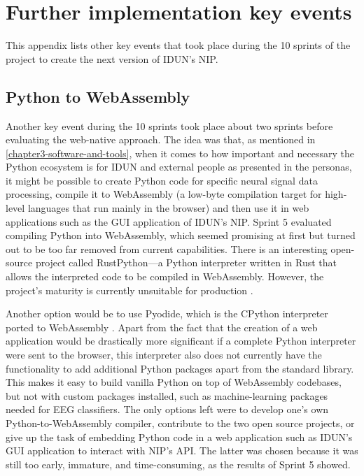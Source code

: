 \chapter{Further implementation key events}
\label{appendix4-further-implementation-key-events}
\graphicspath{{Appendix4/Figs/}{Appendix4/Figs/}}

This appendix lists other key events that took place during the 10 sprints of the project to create the next version of IDUN’s NIP.

\section*{Python to WebAssembly}
\label{chapter4-python-to-webassembly}

Another key event during the 10 sprints took place about two sprints before evaluating the web-native approach. The idea was that, as mentioned in \autoref{chapter3-software-and-tools}, when it comes to how important and necessary the Python ecosystem is for IDUN and external people as presented in the personas, it might be possible to create Python code for specific neural signal data processing, compile it to WebAssembly (a low-byte compilation target for high-level languages that run mainly in the browser)  and then use it in web applications such as the GUI application of IDUN’s NIP. Sprint 5 evaluated compiling Python into WebAssembly, which seemed promising at first but turned out to be too far removed from current capabilities. There is an interesting open-source project called RustPython—a Python interpreter written in Rust that allows the interpreted code to be compiled in WebAssembly. However, the project’s maturity is currently unsuitable for production \citep{noauthor_rustpython_2022}.

Another option would be to use Pyodide, which is the CPython interpreter ported to WebAssembly  \citep{noauthor_pyodide_2022}. Apart from the fact that the creation of a web application would be drastically more significant if a complete Python interpreter were sent to the browser, this interpreter also does not currently have the functionality to add additional Python packages apart from the standard library. This makes it easy to build vanilla Python on top of WebAssembly codebases, but not with custom packages installed, such as machine-learning packages needed for EEG classifiers. The only options left were to develop one’s own Python-to-WebAssembly compiler, contribute to the two open source projects, or give up the task of embedding Python code in a web application such as IDUN’s GUI application to interact with NIP’s API. The latter was chosen because it was still too early, immature, and time-consuming, as the results of Sprint 5 showed.


